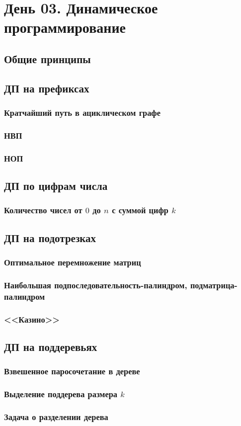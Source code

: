 \documentclass[a4paper,12pt]{article}
\begin{document}
   \section{День 03. Динамическое программирование}

      \subsection{Общие принципы}

      \subsection{ДП на префиксах}
        \subsubsection{Кратчайший путь в ациклическом графе}
        \subsubsection{НВП}
        \subsubsection{НОП}

      \subsection{ДП по цифрам числа}
        \subsubsection{Количество чисел от $0$ до $n$ с суммой цифр $k$}

      \subsection{ДП на подотрезках}
        \subsubsection{Оптимальное перемножение матриц}
        \subsubsection{Наибольшая подпоследовательность-палиндром,
          подматрица-палиндром}
        \subsubsection{<<Казино>>}

      \subsection{ДП на поддеревьях}
        \subsubsection{Взвешенное паросочетание в дереве}
        \subsubsection{Выделение поддерева размера $k$}
        \subsubsection{Задача о разделении дерева}
\end{document}
